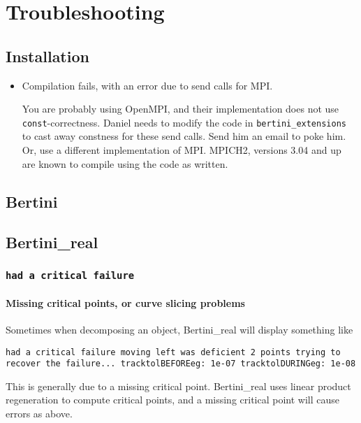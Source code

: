 
\section{Troubleshooting}

	\subsection{Installation}

	\begin{itemize}
	\item Compilation fails, with an error due to send calls for MPI.  

	You are probably using OpenMPI, and their implementation does not use {\tt const}-correctness.  Daniel needs to modify the code in {\tt bertini_extensions} to cast away constness for these send calls.  Send him an email to poke him.  Or, use a different implementation of MPI.  MPICH2, versions 3.04 and up are known to compile using the code as written. 
	\end{itemize}

\subsection{Bertini}

\subsection{Bertini\_real}


\subsubsection{\tt had a critical failure}

\paragraph{Missing critical points, or curve slicing problems}

Sometimes when decomposing an object, Bertini\_real will display something like

{\tt	had a critical failure
 moving left was deficient 2 points
trying to recover the failure...
tracktolBEFOREeg: 1e-07 tracktolDURINGeg: 1e-08
}

This is generally due to a missing critical point.  Bertini\_real uses linear product regeneration to compute critical points, and a missing critical point will cause errors as above.  


